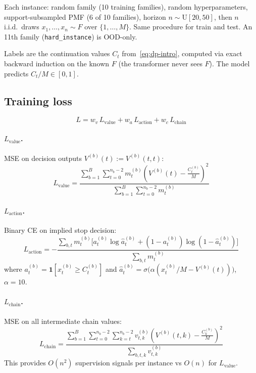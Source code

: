 \documentclass{article}
\begin{document}
Each instance: random family (10 training families), random hyperparameters, support-subsampled PMF (6 of 10 families), horizon $n \sim \mathrm{U}[20, 50]$, then $n$ i.i.d.\ draws $x_1, \ldots, x_n \sim F$ over $\{1, \ldots, M\}$. Same procedure for train and test. An 11th family (\texttt{hard\_instance}) is OOD-only.

Labels are the continuation values $C_t$ from~\eqref{eq:dp-intro}, computed via exact backward induction on the known $F$ (the transformer never sees $F$). The model predicts $C_t/M \in [0,1]$.

\subsection{Training loss}

\[
L = w_v \, L_{\mathrm{value}} + w_a \, L_{\mathrm{action}} + w_c \, L_{\mathrm{chain}}
\]

\paragraph{$L_{\mathrm{value}}$.} MSE on decision outputs $V^{(b)}(t) := V^{(b)}(t,t)$:
\[
L_{\mathrm{value}} = \frac{\displaystyle\sum_{b=1}^{B}\sum_{t=0}^{n_b-2} m_t^{(b)}\!\left(V^{(b)}(t) - \frac{C_t^{(b)}}{M}\right)^{\!2}}{\displaystyle\sum_{b=1}^{B}\sum_{t=0}^{n_b-2} m_t^{(b)}}
\]

\paragraph{$L_{\mathrm{action}}$.} Binary CE on implied stop decision:
\[
L_{\mathrm{action}} = -\frac{\displaystyle\sum_{b,t} m_t^{(b)}\!\Big[a_t^{(b)}\log\hat{a}_t^{(b)} + (1{-}a_t^{(b)})\log(1{-}\hat{a}_t^{(b)})\Big]}{\displaystyle\sum_{b,t} m_t^{(b)}}
\]
where $a_t^{(b)} = \mathbf{1}[x_t^{(b)} \ge C_t^{(b)}]$ and $\hat{a}_t^{(b)} = \sigma\!\big(\alpha(x_t^{(b)}/M - V^{(b)}(t))\big)$, $\alpha = 10$.

\paragraph{$L_{\mathrm{chain}}$.} MSE on all intermediate chain values:
\[
L_{\mathrm{chain}} = \frac{\displaystyle\sum_{b=1}^{B}\sum_{t=0}^{n_b-2}\sum_{k=t}^{n_b-2} v_{t,k}^{(b)}\!\left(V^{(b)}(t,k) - \frac{C_k^{(b)}}{M}\right)^{\!2}}{\displaystyle\sum_{b,t,k} v_{t,k}^{(b)}}
\]
This provides $O(n^2)$ supervision signals per instance vs $O(n)$ for $L_{\mathrm{value}}$.
\end{document}
